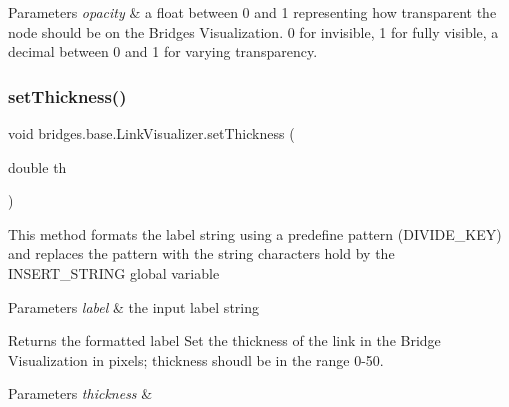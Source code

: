 \begin{DoxyParams}{Parameters}
{\em opacity} & a float between 0 and 1 representing how transparent the node should be on the Bridges Visualization. 0 for invisible, 1 for fully visible, a decimal between 0 and 1 for varying transparency. \\
\hline
\end{DoxyParams}
\mbox{\label{classbridges_1_1base_1_1_link_visualizer_a702e9ca345d1a4a035baf2041f275849}} 
\subsubsection{\texorpdfstring{set\+Thickness()}{setThickness()}}
{\footnotesize\ttfamily void bridges.\+base.\+Link\+Visualizer.\+set\+Thickness (\begin{DoxyParamCaption}\item[{double}]{th }\end{DoxyParamCaption})}

This method formats the label string using a predefine pattern (D\+I\+V\+I\+D\+E\+\_\+\+K\+EY) and replaces the pattern with the string characters hold by the I\+N\+S\+E\+R\+T\+\_\+\+S\+T\+R\+I\+NG global variable


\begin{DoxyParams}{Parameters}
{\em label} & the input label string\\
\hline
\end{DoxyParams}
\begin{DoxyReturn}{Returns}
the formatted label Set the thickness of the link in the Bridge Visualization in pixels; thickness shoudl be in the range 0-\/50.
\end{DoxyReturn}

\begin{DoxyParams}{Parameters}
{\em thickness} & \\
\hline
\end{DoxyParams}
\mbox{\label{classbridges_1_1base_1_1_link_visualizer_a21d5884d243cf5a08f9d544f5083a44c}} 
